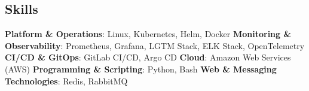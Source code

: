 \documentclass[../main.tex]{subfiles}
\begin{document}
\begin{category}
\section{Skills}
    \citembullet \textbf{Platform \& Operations}: Linux, Kubernetes, Helm, Docker
    \citembullet \textbf{Monitoring \& Observability}: Prometheus, Grafana, LGTM Stack, ELK Stack, OpenTelemetry
    \citembullet \textbf{CI/CD \& GitOps}: GitLab CI/CD, Argo CD
    \citembullet \textbf{Cloud}: Amazon Web Services (AWS)
    \citembullet \textbf{Programming \& Scripting}: Python, Bash
    \citembullet \textbf{Web \& Messaging Technologies}: Redis, RabbitMQ
    \\[-12pt]
\end{category}
\end{document}
